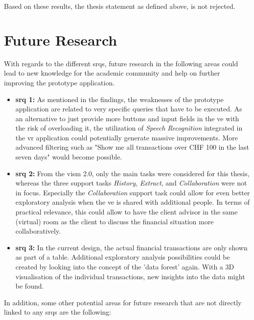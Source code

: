 Based on these results, the thesis statement as defined above, is not rejected.



\section{Future Research}

With regards to the different \glspl{srq}, future research in the following areas could lead to new knowledge for the academic community and help on further improving the prototype application.
\begin{itemize}[]
	\item \textbf{\gls{srq} 1:} As mentioned in the findings, the weaknesses of the prototype application are related to very specific queries that have to be executed. As an alternative to just provide more buttons and input fields in the \gls{ve} with the risk of overloading it, the utilization of \textit{Speech Recognition} integrated in the \gls{vr} application could potentially generate massive improvements. More advanced filtering such as "Show me all transactions over CHF 100 in the last seven days" would become possible.
	
	\item \textbf{\gls{srq} 2:} From the \gls{vism} 2.0, only the main tasks were considered for this thesis, whereas the three support tasks \textit{History}, \textit{Extract}, and \textit{Collaboration} were not in focus. Especially the \textit{Collaboration} support task could allow for even better exploratory analysis when the \gls{ve} is shared with additional people. In terms of practical relevance, this could allow to have the client advisor in the same (virtual) room as the client to discuss the financial situation more collaboratively.
	
	\item \textbf{\gls{srq} 3:} In the current design, the actual financial transactions are only shown as part of a table. Additional exploratory analysis possibilities could be created by looking into the concept of the 'data forest' again. With a 3D visualisation of the individual transactions, new insights into the data might be found.
\end{itemize}
In addition, some other potential areas for future research that are not directly linked to any \glspl{srq} are the following:
